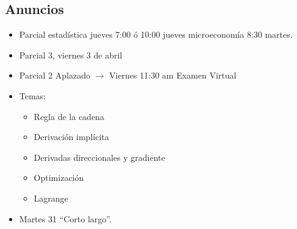 \subsection*{Anuncios}
\begin{itemize}
    \item Parcial estadística jueves 7:00 ó 10:00 jueves microeconomía 8:30 martes.
    \item Parcial 3, viernes 3 de abril 
    \item Parcial 2 Aplazado $\rightarrow$ Viernes 11:30 am Examen Virtual 
    \item Temas:
        \begin{itemize}
            \item Regla de la cadena 
            \item Derivación implícita 
            \item Derivadas direccionales y gradiente 
            \item Optimización 
            \item Lagrange 
        \end{itemize}
    
    \item Martes 31 ``Corto largo''. 
\end{itemize}
